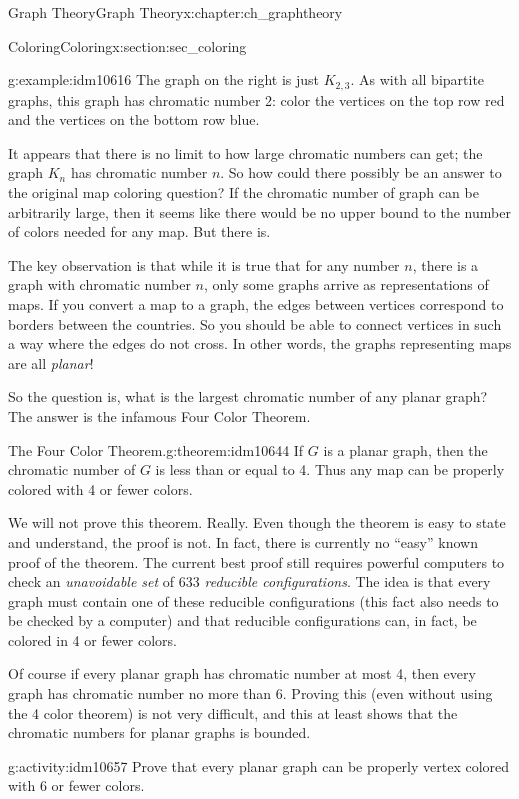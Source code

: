 \documentclass[oneside,10pt,]{book}
\numberwithin{equation}{chapter}
\begin{document}
\begin{chapterptx}{Graph Theory}{}{Graph Theory}{}{}{x:chapter:ch_graphtheory}
\begin{sectionptx}{Coloring}{}{Coloring}{}{}{x:section:sec_coloring}
\begin{introduction}{}
\begin{example}{}{g:example:idm10616}
The graph on the right is just \(K_{2,3}\). As with all bipartite graphs, this graph has chromatic number 2: color the vertices on the top row red and the vertices on the bottom row blue.%
\end{example}
It appears that there is no limit to how large chromatic numbers can get; the graph \(K_n\) has chromatic number \(n\). So how could there possibly be an answer to the original map coloring question? If the chromatic number of graph can be arbitrarily large, then it seems like there would be no upper bound to the number of colors needed for any map. But there is.%
\par
The key observation is that while it is true that for any number \(n\), there is a graph with chromatic number \(n\), only some graphs arrive as representations of maps. If you convert a map to a graph, the edges between vertices correspond to borders between the countries. So you should be able to connect vertices in such a way where the edges do not cross. In other words, the graphs representing maps are all \emph{planar}!%
\par
So the question is, what is the largest chromatic number of any planar graph? The answer is the infamous Four Color Theorem.%
\begin{theorem}{The Four Color Theorem.}{}{g:theorem:idm10644}%
 If \(G\) is a planar graph, then the chromatic number of \(G\) is less than or equal to 4. Thus any map can be properly colored with 4 or fewer colors.%
\end{theorem}
We will not prove this theorem. Really. Even though the theorem is easy to state and understand, the proof is not. In fact, there is currently no ``easy'' known proof of the theorem. The current best proof still requires powerful computers to check an \emph{unavoidable set} of 633 \emph{reducible configurations}. The idea is that every graph must contain one of these reducible configurations (this fact also needs to be checked by a computer) and that reducible configurations can, in fact, be colored in 4 or fewer colors.%
\par
Of course if every planar graph has chromatic number at most 4, then every graph has chromatic number no more than 6.  Proving this (even without using the 4 color theorem) is not very difficult, and this at least shows that the chromatic numbers for planar graphs is bounded.%
\begin{activity}{}{g:activity:idm10657}%
Prove that every planar graph can be properly vertex colored with 6 or fewer colors.%

\end{activity}
\end{introduction}
\end{sectionptx}
\end{chapterptx}
\end{document}
